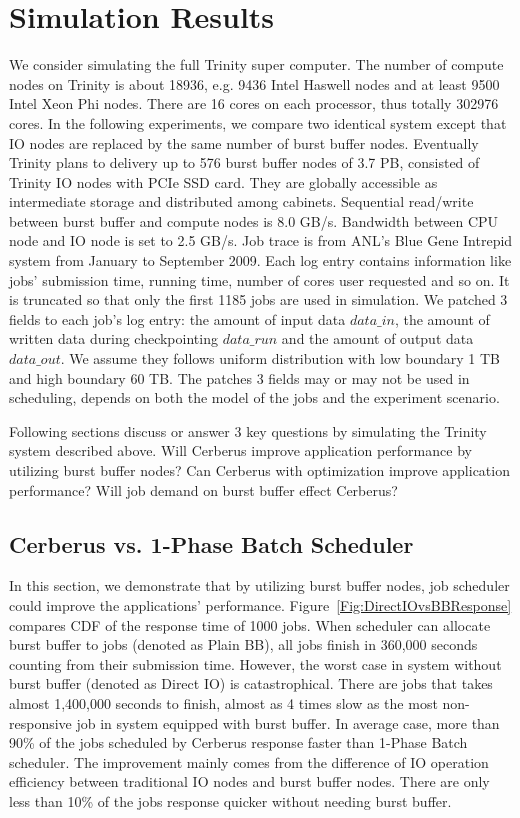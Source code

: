 \section{Simulation Results}
We consider simulating the full Trinity super computer\cite{TrinitySystem}.
The number of compute nodes on Trinity is about 18936,
e.g. 9436 Intel Haswell nodes
and at least 9500 Intel Xeon Phi nodes.
There are 16 cores on each processor, thus totally 302976 cores.
In the following experiments, we compare two identical system except that
IO nodes are replaced by the same number of burst buffer nodes.
Eventually Trinity plans to delivery up to 576 burst buffer nodes of 3.7 PB,
consisted of Trinity IO nodes with PCIe SSD card.
They are globally accessible as intermediate storage and distributed among cabinets.
Sequential read/write between burst buffer and compute nodes is 8.0 GB/s.
Bandwidth between CPU node and IO node is set to 2.5 GB/s.
Job trace is from ANL's Blue Gene Intrepid system
from January to September 2009\cite{JobTrace}.
Each log entry contains information like jobs' submission time, running time,
number of cores user requested and so on. 
It is truncated so that only the first 1185 jobs are used in simulation.
We patched 3 fields to each job's log entry: the amount of input data $data\_in$,
the amount of written data during checkpointing $data\_run$ and the amount of output data $data\_out$.
We assume they follows uniform distribution with low boundary 1 TB and high boundary 60 TB.
The patches 3 fields may or may not be used in scheduling,
depends on both the model of the jobs and the experiment scenario.

Following sections discuss or answer 3 key questions by
simulating the Trinity system described above.
Will Cerberus improve application performance by utilizing burst buffer nodes?
Can Cerberus with optimization improve application performance?
Will job demand on burst buffer effect Cerberus?

\subsection{Cerberus vs. 1-Phase Batch Scheduler}
\label{Sec:Sim:DirectIOvsBB}
In this section, we demonstrate that by utilizing burst buffer nodes,
job scheduler could improve the applications' performance.
Figure~\ref{Fig:DirectIOvsBBResponse} compares CDF of the response time of 1000 jobs.
When scheduler can allocate burst buffer to jobs (denoted as Plain BB),
all jobs finish in 360,000 seconds counting from their submission time.
However, the worst case in system without burst buffer (denoted as Direct IO) is catastrophical.
There are jobs that takes almost 1,400,000 seconds to finish,
almost as 4 times slow as the most non-responsive job in system equipped with burst buffer.
In average case, more than 90\% of the jobs scheduled by Cerberus response faster than 1-Phase Batch scheduler.
The improvement mainly comes from the difference of IO operation efficiency between
traditional IO nodes and burst buffer nodes.
There are only less than 10\% of the jobs response quicker without needing burst buffer.

